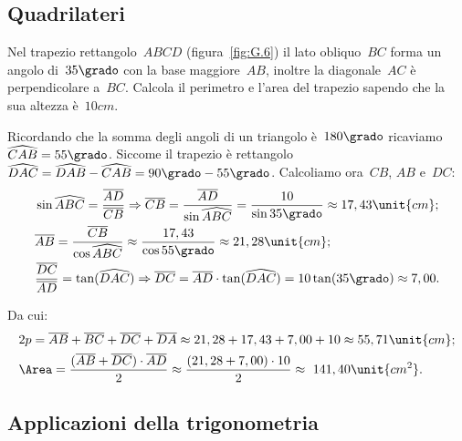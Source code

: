 
\subsection{Quadrilateri}
\label{subsec:trigo_quadrilatei}

\begin{exrig}\vspace{1.10ex}
 \begin{esempio}
Nel trapezio rettangolo~$ABCD$ (figura~\ref{fig:G.6}) il lato obliquo~$BC$ forma 
un angolo di~$35\grado$ con la base maggiore~$AB$, inoltre la diagonale~$AC$
è perpendicolare a~$BC$. Calcola il perimetro e l'area del trapezio sapendo che 
la sua altezza è~$10\unit{cm}$.

Ricordando che la somma degli angoli di un triangolo è~$180\grado$ 
ricaviamo~$\widehat{CAB}=55\grado$.
Siccome il trapezio è rettangolo
$\widehat{DAC}=\widehat{DAB}-\widehat{CAB}=90\grado-55\grado$.
Calcoliamo ora~$CB$, $AB$ e~$DC$:
\begin{align*}
&\sin \widehat{ABC} =\frac{\overline{AD}}{\overline{CB}} \Rightarrow 
\overline{CB}=\frac{\overline{AD}}{\sin \widehat{ABC}}=\frac{10}{\sin 35\grado
}\approx17,43\unit{cm};\\
&\overline{AB}=\frac{\overline{CB}}{\cos \widehat{ABC}}\approx\frac{17,43}{
\cos 55\grado}\approx21,28\unit{cm};\\
&\frac{\overline{DC}}{\overline{AD}}=\tan(\widehat{DAC}) \Rightarrow 
\overline{DC}=\overline{AD}\cdot\tan(\widehat{DAC})=10\tan(35\grado)\approx7,00.
\end{align*}


Da cui:
\begin{align*}
&2p=\overline{AB}+\overline{BC}+\overline{DC}+\overline{DA}\approx21,28+17,43+7,
00+10\approx55,71\unit{cm};\\
&\Area=\frac{(\overline{AB}+\overline{DC})\cdot\overline{AD}}{2}\approx\frac{(21
,28+7,00)\cdot 10}{2}\approx~141,40\unit{cm^2}.
\end{align*}
 \end{esempio}
\end{exrig}


\subsection{Applicazioni della trigonometria}
\label{subsec:trigo_applicazioni}

